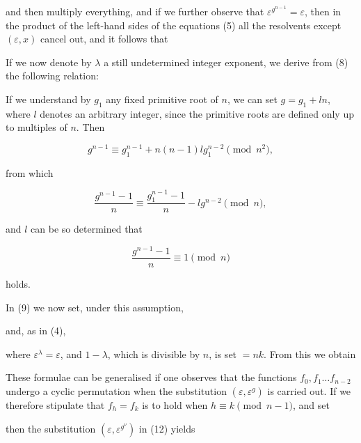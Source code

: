 and then multiply everything, and if we further observe that
$\varepsilon^{g^{n-1}} = \varepsilon$, then in the product of the
left-hand sides of the equations (5) all the resolvents except
$(\varepsilon, x)$ cancel out, and it follows that


If we now denote by $\lambda$ a still undetermined integer
exponent, we derive from (8) the following relation:


If we understand by $g_1$ any fixed primitive root of $n$, we
can set $g = g_1 + l n$, where $l$ denotes an arbitrary integer,
since the primitive roots are defined only up to multiples of $n$.
Then

\[
g^{n-1} \equiv g_1^{n-1} + n(n-1) l g_1^{n-2} \pmod{n^2},
\]

from which

\[
\frac{g^{n-1}-1}{n} \equiv \frac{g_1^{n-1}-1}{n} - l g^{n-2} \pmod{n},
\]

and $l$ can be so determined that

\[
\frac{g^{n-1}-1}{n} \equiv 1 \pmod{n}
\]

holds.

In (9) we now set, under this assumption,


and, as in (4),


where $\varepsilon^\lambda = \varepsilon$, and $1 - \lambda$, which is
divisible by $n$, is set $= nk$. From this we obtain


These formulae can be generalised if one observes that the
functions $f_0, f_1 \ldots f_{n-2}$ undergo a cyclic permutation
when the substitution $(\varepsilon, \varepsilon^g)$ is carried out.
If we therefore stipulate that $f_h = f_k$ is to hold when $h \equiv k
\pmod{n-1}$, and set


then the substitution $(\varepsilon, \varepsilon^{g^\nu})$ in (12) yields

